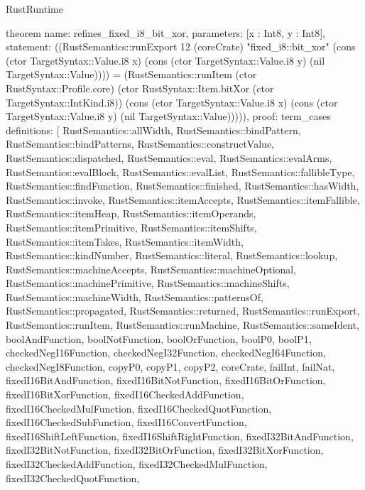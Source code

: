 \begin{lexlean}{RustRuntime}
\begin{semanticmodule}
theorem{
  name: refines_fixed_i8_bit_xor,
  parameters: [x : Int8, y : Int8],
  statement: ((RustSemantics::runExport 12 (coreCrate) "fixed_i8::bit_xor" (cons (ctor TargetSyntax::Value.i8 x) (cons (ctor TargetSyntax::Value.i8 y) (nil TargetSyntax::Value)))) = (RustSemantics::runItem (ctor RustSyntax::Profile.core) (ctor RustSyntax::Item.bitXor (ctor TargetSyntax::IntKind.i8)) (cons (ctor TargetSyntax::Value.i8 x) (cons (ctor TargetSyntax::Value.i8 y) (nil TargetSyntax::Value))))),
  proof: term_cases{
    definitions: [
      RustSemantics::allWidth,
      RustSemantics::bindPattern,
      RustSemantics::bindPatterns,
      RustSemantics::constructValue,
      RustSemantics::dispatched,
      RustSemantics::eval,
      RustSemantics::evalArms,
      RustSemantics::evalBlock,
      RustSemantics::evalList,
      RustSemantics::fallibleType,
      RustSemantics::findFunction,
      RustSemantics::finished,
      RustSemantics::hasWidth,
      RustSemantics::invoke,
      RustSemantics::itemAccepts,
      RustSemantics::itemFallible,
      RustSemantics::itemHeap,
      RustSemantics::itemOperands,
      RustSemantics::itemPrimitive,
      RustSemantics::itemShifts,
      RustSemantics::itemTakes,
      RustSemantics::itemWidth,
      RustSemantics::kindNumber,
      RustSemantics::literal,
      RustSemantics::lookup,
      RustSemantics::machineAccepts,
      RustSemantics::machineOptional,
      RustSemantics::machinePrimitive,
      RustSemantics::machineShifts,
      RustSemantics::machineWidth,
      RustSemantics::patternsOf,
      RustSemantics::propagated,
      RustSemantics::returned,
      RustSemantics::runExport,
      RustSemantics::runItem,
      RustSemantics::runMachine,
      RustSemantics::sameIdent,
      boolAndFunction,
      boolNotFunction,
      boolOrFunction,
      boolP0,
      boolP1,
      checkedNegI16Function,
      checkedNegI32Function,
      checkedNegI64Function,
      checkedNegI8Function,
      copyP0,
      copyP1,
      copyP2,
      coreCrate,
      failInt,
      failNat,
      fixedI16BitAndFunction,
      fixedI16BitNotFunction,
      fixedI16BitOrFunction,
      fixedI16BitXorFunction,
      fixedI16CheckedAddFunction,
      fixedI16CheckedMulFunction,
      fixedI16CheckedQuotFunction,
      fixedI16CheckedSubFunction,
      fixedI16ConvertFunction,
      fixedI16ShiftLeftFunction,
      fixedI16ShiftRightFunction,
      fixedI32BitAndFunction,
      fixedI32BitNotFunction,
      fixedI32BitOrFunction,
      fixedI32BitXorFunction,
      fixedI32CheckedAddFunction,
      fixedI32CheckedMulFunction,
      fixedI32CheckedQuotFunction,
}}
\end{semanticmodule}
\end{lexlean}
